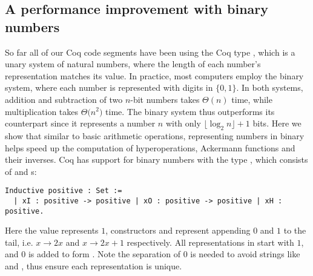 
\subsection{A performance improvement with binary numbers}
So far all of our Coq code segments have been using the Coq type , which is a unary system of natural numbers, where the length of each number's representation matches its value. In practice, most computers employ the binary system, where each number is represented with digits in $\{0, 1\}$. In both systems, addition and subtraction of two $n$-bit numbers takes $\Theta(n)$ time, while multiplication takes $\Theta \big(n^2\big)$ time. The binary system thus outperforms its counterpart since it represents a number $n$ with only $\lfloor \log_2n \rfloor + 1$ bits. Here we show that similar to basic arithmetic operations, representing numbers in binary helps speed up the computation of hyperoperations, Ackermann functions and their inverses. Coq has support for binary numbers with the type , which consists of  and s:
\begin{lstlisting}
Inductive positive : Set := 
  | xI : positive -> positive | xO : positive -> positive | xH : positive.
\end{lstlisting}
Here the value  represents $1$, constructors  and  represent appending $0$ and $1$ to the tail, i.e. $x\to 2x$ and $x\to 2x+1$ respectively. All representations in  start with $1$, and $0$ is added to form . Note the separation of $0$ is needed to avoid strings like  and , thus ensure each representation is unique.


